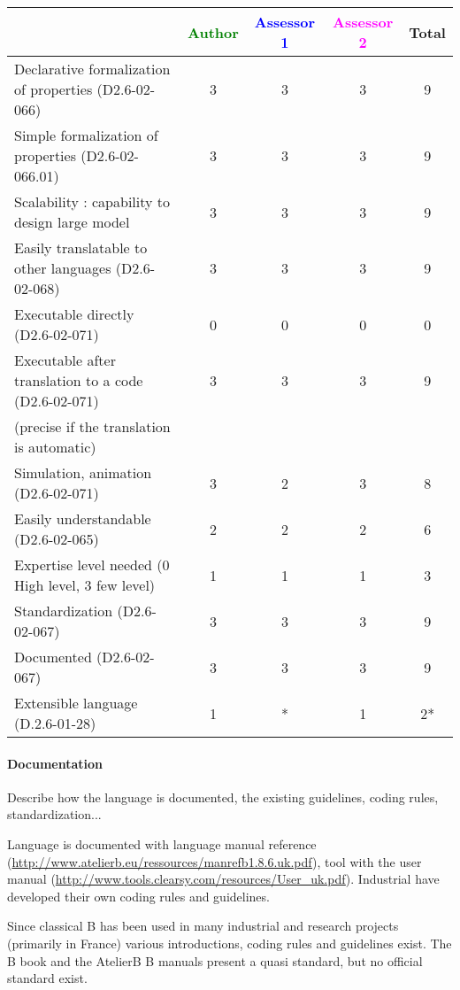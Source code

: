 \begin{tabular}{|l | c | c | c | c|}
\hline
& \textcolor{green}{Author} & \textcolor{blue}{Assessor 1} & \textcolor{magenta}{Assessor 2} & Total \\
\hline
Declarative formalization of properties (D2.6-02-066) & 3 & 3 & 3 & 9 \\
\hline
Simple formalization of properties (D2.6-02-066.01) & 3 & 3 & 3 & 9  \\
\hline
Scalability : capability to design large model & 3 & 3 & 3 & 9 \\
\hline
Easily translatable to other languages (D2.6-02-068) & 3 & 3 & 3 & 9 \\
\hline
Executable directly (D2.6-02-071) & 0 & 0 & 0 & 0 \\
\hline
Executable after translation to a code (D2.6-02-071) & 3 & 3 & 3 & 9 \\
(precise if the translation is automatic) & & & & \\
\hline
Simulation, animation (D2.6-02-071) &  3 & 2 & 3 & 8 \\
\hline
Easily understandable (D2.6-02-065) & 2 & 2 & 2 & 6 \\
\hline
Expertise level needed (0 High level, 3 few level) &  1 & 1 & 1 & 3 \\
\hline
Standardization (D2.6-02-067) & 3 & 3 & 3 & 9 \\
\hline
Documented (D2.6-02-067) & 3 & 3 & 3 & 9 \\
\hline
Extensible language (D.2.6-01-28) & 1 & * & 1 & 2* \\
\hline
\end{tabular}


\paragraph{Documentation} Describe how the language is documented, the existing guidelines, coding rules, standardization...

\begin{author_comment}

Language is documented with language manual reference (\url{http://www.atelierb.eu/ressources/manrefb1.8.6.uk.pdf}), tool with the user manual (\url{http://www.tools.clearsy.com/resources/User_uk.pdf}). Industrial have developed their own coding rules and guidelines.
\end{author_comment}

\begin{assessor2}
Since classical B has been used in many industrial and research projects (primarily in France) various introductions, coding rules and guidelines exist. The B book and the AtelierB B manuals present a quasi standard, but no official standard exist.
\end{assessor2}


